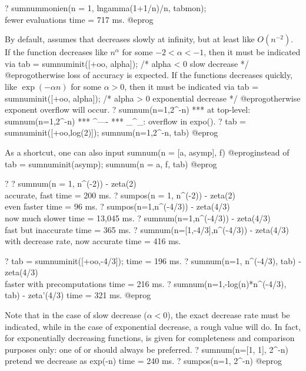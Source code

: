 ? sumnummonien(n = 1, lngamma(1+1/n)/n, tabmon); \\ fewer evaluations
time = 717 ms.
@eprog

By default,  assumes that  decreases slowly at infinity,
but at least like $O(n^{-2})$. If the function decreases like $n^{\alpha}$
for some $-2 < \alpha < -1$, then it must be indicated via
\bprog
  tab = sumnuminit([+oo, alpha]); /* alpha < 0 slow decrease */
@eprog\noindent otherwise loss of accuracy is expected.
If the functions decreases quickly, like $\exp(-\alpha n)$ for some
$\alpha > 0$, then it must be indicated via
\bprog
  tab = sumnuminit([+oo, alpha]); /* alpha  > 0 exponential decrease */
@eprog\noindent otherwise exponent overflow will occur.
\bprog
? sumnum(n=1,2^-n)
 ***   at top-level: sumnum(n=1,2^-n)
 ***                             ^----
 *** _^_: overflow in expo().
? tab = sumnuminit([+oo,log(2)]); sumnum(n=1,2^-n, tab)
@eprog

As a shortcut, one can also input
\bprog
  sumnum(n = [a, asymp], f)
@eprog\noindent instead of
\bprog
  tab = sumnuminit(asymp);
  sumnum(n = a, f, tab)
@eprog

\bprog
? 
? sumnum(n = 1, n^(-2)) - zeta(2) \\ accurate, fast
time = 200 ms.
? sumpos(n = 1, n^(-2)) - zeta(2)  \\ even faster
time = 96 ms.
? sumpos(n=1,n^(-4/3)) - zeta(4/3)   \\ now much slower
time = 13,045 ms.
? sumnum(n=1,n^(-4/3)) - zeta(4/3)  \\ fast but inaccurate
time = 365 ms.
? sumnum(n=[1,-4/3],n^(-4/3)) - zeta(4/3) \\ with decrease rate, now accurate
time = 416 ms.

? tab = sumnuminit([+oo,-4/3]);
time = 196 ms.
? sumnum(n=1, n^(-4/3), tab) - zeta(4/3) \\ faster with precomputations
time = 216 ms.
? sumnum(n=1,-log(n)*n^(-4/3), tab) - zeta'(4/3)
time = 321 ms.
@eprog

Note that in the case of slow decrease ($\alpha < 0$), the exact
decrease rate must be indicated, while in the case of exponential decrease,
a rough value will do. In fact, for exponentially decreasing functions,
 is given for completeness and comparison purposes only: one
of  or  should always be preferred.
\bprog
? sumnum(n=[1, 1], 2^-n) \\ pretend we decrease as exp(-n)
time = 240 ms.
? sumpos(n=1, 2^-n)
@eprog

